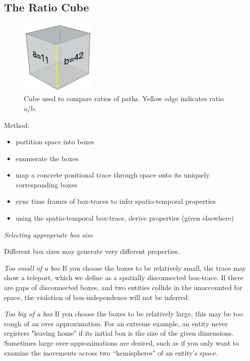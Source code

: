 \subsection{The Ratio Cube}

\begin{figure}
  \centering
  \includegraphics[width=0.32\textwidth]{./figures/counting_cube.png}
  \caption{Cube used to compare ratios of paths.  Yellow edge indicates ratio a/b.}
  \label{fig:countingCube}
\end{figure}


Method:
\begin{itemize}
 \item partition space into boxes
 \item enumerate the boxes
 \item map a concrete positional trace through space onto its uniquely corresponding boxes
 \item sync time frames of box-traces to infer spatio-temporal properties
 \item using the spatio-temporal box-trace, derive properties (given elsewhere)
\end{itemize}

\emph{Selecting appropriate box size}

Different box sizes may generate very different properties.

\emph{Too small of a box} If you choose the boxes to be relatively small, the trace may show a teleport, which we define as a spatially disconnected box-trace.
If there are gaps of disconnected boxes, and two entities collide in the unaccounted for space, the violation of box-independence will not be inferred.

\emph{Too big of a box} If you choose the boxes to be relatively large, this may be too rough of an over approximation.
For an extreme example, an entity never registers "leaving home" if its initial box is the size of the given dimensions.
Sometimes large over-approximations are desired, such as if you only want to examine the movements across two ``hemispheres" of an entity's space.
